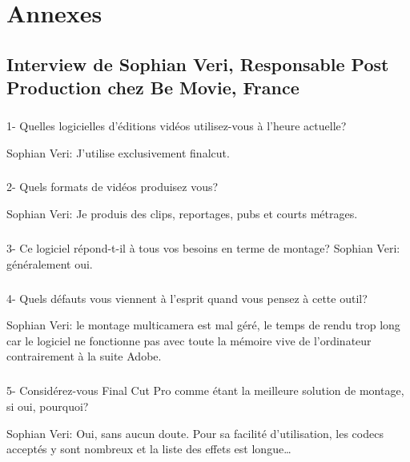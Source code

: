 \newpage

\chapter*{Annexes}

\section*{Interview de Sophian Veri,
Responsable Post Production chez Be Movie, France}

\paragraph{}
1-  Quelles logicielles d'éditions vidéos utilisez-vous à l'heure actuelle?

Sophian Veri: J'utilise exclusivement finalcut.

\paragraph{}
2- Quels formats de vidéos produisez vous?

Sophian Veri: Je produis des clips, reportages, pubs et courts métrages.

\paragraph{}
3- Ce logiciel répond-t-il à tous vos besoins en terme de montage?
Sophian Veri: généralement oui.

\paragraph{}
4- Quels défauts vous viennent à l'esprit quand vous pensez à cette outil?

Sophian Veri: le montage multicamera est mal géré, le temps de rendu trop long car le
logiciel ne fonctionne pas avec toute la mémoire vive de l'ordinateur
contrairement à la suite Adobe.

\paragraph{}
5- Considérez-vous Final Cut Pro comme étant la meilleure solution de montage,
si oui, pourquoi?

Sophian Veri: Oui, sans aucun doute. Pour sa facilité d'utilisation,
les codecs acceptés y sont nombreux et la liste des effets est
longue\ldots

